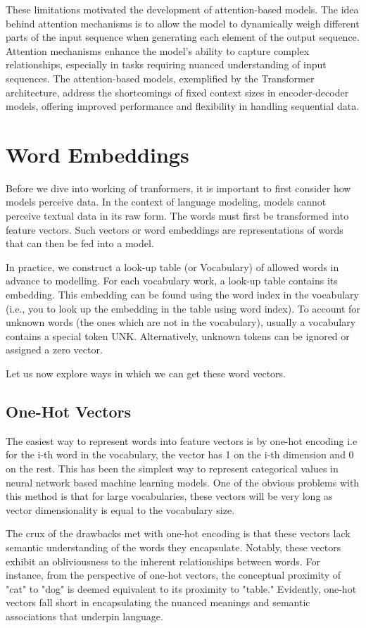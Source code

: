 \documentclass{report}
\begin{document}
These limitations motivated the development of attention-based models. The idea behind attention mechanisms is to allow the model to dynamically weigh different parts of the input sequence when generating each element of the output sequence. Attention mechanisms enhance the model's ability to capture complex relationships, especially in tasks requiring nuanced understanding of input sequences. The attention-based models, exemplified by the Transformer architecture, address the shortcomings of fixed context sizes in encoder-decoder models, offering improved performance and flexibility in handling sequential data.

\section{Word Embeddings}
Before we dive into working of tranformers, it is important to first consider how models perceive data. In the context of language modeling, models cannot perceive textual data in its raw form. The words must first be transformed into feature vectors. Such vectors or word embeddings are representations of words that can then be fed into a model.

In practice, we construct a look-up table (or Vocabulary) of allowed words in advance to modelling. For each vocabulary work, a look-up table contains its embedding. This embedding can be found using the word index in the vocabulary (i.e., you to look up the embedding in the table using word index). To account for unknown words (the ones which are not in the vocabulary), usually a vocabulary contains a special token UNK. Alternatively, unknown tokens can be ignored or assigned a zero vector.

Let us now explore ways in which we can get these word vectors.

\subsection{One-Hot Vectors}
The easiest way to represent words into feature vectors is by one-hot encoding i.e for the i-th word in the vocabulary, the vector has 1 on the i-th dimension and 0 on the rest. This has been the simplest way to represent categorical values in neural network based machine learning models. One of the obvious problems with this method is that for large vocabularies, these vectors will be very long as vector dimensionality is equal to the vocabulary size.

The crux of the drawbacks met with one-hot encoding is that these vectors lack semantic understanding of the words they encapsulate. Notably, these vectors exhibit an obliviousness to the inherent relationships between words. For instance, from the perspective of one-hot vectors, the conceptual proximity of "cat" to "dog" is deemed equivalent to its proximity to "table." Evidently, one-hot vectors fall short in encapsulating the nuanced meanings and semantic associations that underpin language.
\end{document}
